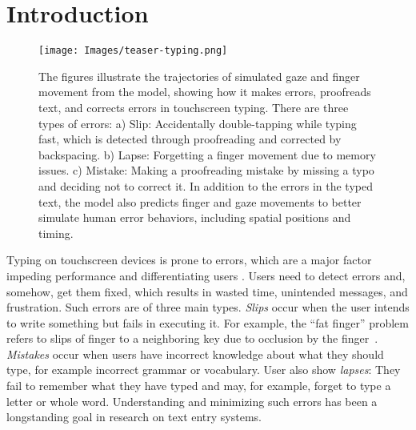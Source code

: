 \section{Introduction}

\begin{figure}[!t]
\centering
  \texttt{[image: Images/teaser-typing.png]}
  \caption{
    The figures illustrate the trajectories of simulated gaze and finger movement from the model, showing how it makes errors, proofreads text, and corrects errors in touchscreen typing. There are three types of errors: a) Slip: Accidentally double-tapping while typing fast, which is detected through proofreading and corrected by backspacing. b) Lapse: Forgetting a finger movement due to memory issues. c) Mistake: Making a proofreading mistake by missing a typo and deciding not to correct it. In addition to the errors in the typed text, the model also predicts finger and gaze movements to better simulate human error behaviors, including spatial positions and timing.}
  \label{fig:teaser}
\end{figure}




Typing on touchscreen devices is prone to errors, which are a major factor impeding performance and differentiating users \cite{dhakal2018observations}. 
Users need to detect errors and, somehow, get them fixed, 
which results in wasted time, unintended messages, and frustration. 
Such errors are of three main types.
\emph{Slips} occur when the user intends to write something but fails in executing it.
For example, the ``fat finger'' problem refers to slips of finger to a neighboring key due to occlusion by the finger~\cite{siek2005fat}. 
\emph{Mistakes} occur when users have incorrect knowledge about what they should type, for example incorrect grammar or vocabulary.
User also show \emph{lapses}: They fail to remember what they have typed and may, for example, forget to type a letter or whole word. 
%
Understanding and minimizing such errors has been a longstanding goal in research on text entry systems. 

